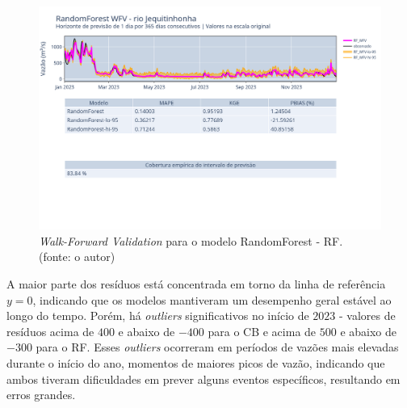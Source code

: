 \begin{figure}[!h]
	\centering
	\includegraphics[scale=0.33]{Figuras/jequiti/wfv/RF/RF_WFV_ORIG.png}
	\caption{\textit{Walk-Forward Validation} para o modelo RandomForest - RF.\\(fonte: o autor)}
	\label{fig:jequiti_RF_WFV_ORIG}
\end{figure}
\clearpage

%
%

A maior parte dos resíduos está concentrada em torno da linha de referência $y=0$, indicando que os modelos mantiveram um desempenho geral estável ao longo do tempo. Porém, há \textit{outliers} significativos no início de $2023$ - valores de resíduos acima de $400$ e abaixo de $-400$ para o CB e acima de $500$ e abaixo de $-300$ para o RF. Esses \textit{outliers} ocorreram em períodos de vazões mais elevadas durante o início do ano, momentos de maiores picos de vazão, indicando que ambos tiveram dificuldades em prever alguns eventos específicos, resultando em erros grandes.

